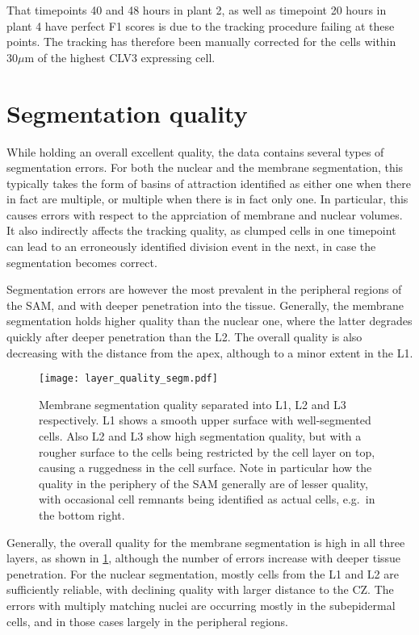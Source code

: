 That timepoints 40 and 48 hours in plant 2, as well as timepoint 20 hours in
plant 4 have perfect F1 scores is due to the tracking procedure failing at
these points. The tracking has therefore been manually corrected for the cells
within $30\mu$m of the highest CLV3 expressing cell.

\section{Segmentation quality}
\label{sec:data_errors_segmentation}
While holding an overall excellent quality, the data contains several types
of segmentation errors. For both the  
nuclear and the membrane segmentation, this typically takes the form of basins
of attraction identified as either one when there in fact are multiple, or
multiple when there is in fact only one. In particular, this causes errors with
respect to the apprciation of membrane and nuclear volumes. It also indirectly
affects the tracking quality, as clumped cells in one timepoint can lead to an
erroneously identified division event in the next, in case the segmentation
becomes correct. 

Segmentation errors are however the most prevalent in the peripheral regions of
the SAM, and with deeper penetration into the tissue. Generally, the membrane
segmentation holds higher quality than the nuclear one, where the latter
degrades quickly after deeper penetration than the L2. The overall quality is
also decreasing with the distance from the apex, although to a minor extent in
the L1. 

\begin{figure}[H]
  \centering
  \texttt{[image: layer\_quality\_segm.pdf]}
  \caption[Membrane segmentation quality per layer]{Membrane segmentation
    quality separated into L1, L2 and L3 respectively. L1 shows a smooth upper
    surface with well-segmented cells. Also L2 and L3 show high segmentation
    quality, but with a rougher surface to the cells being restricted by the
    cell layer on top, causing a ruggedness in the cell surface. Note in
    particular how the quality in the periphery of the SAM generally are of
    lesser quality, with occasional cell remnants being identified as actual
    cells, e.g.\ in the bottom right.}
  \label{fig:layer_quality_segm}
\end{figure}

Generally, the overall quality for the membrane segmentation is high in all
three layers, as shown in \cref{fig:layer_quality_segm}, although the number of errors increase with deeper tissue
penetration. For the nuclear segmentation, mostly cells from the L1 and L2 are
sufficiently reliable, with declining quality with larger distance to the CZ.
The errors with multiply matching nuclei are occurring mostly in the subepidermal
cells, and in those cases largely in the peripheral regions.

